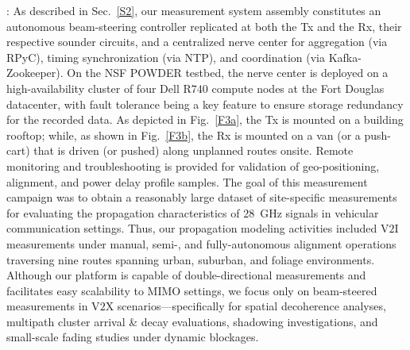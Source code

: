 \documentclass[10pt, twocolumn]{IEEEtran}
\begin{document}
: As described in Sec.~\ref{S2}, our measurement system assembly constitutes an autonomous beam-steering controller replicated at both the Tx and the Rx, their respective sounder circuits, and a centralized nerve center for aggregation (via RPyC), timing synchronization (via NTP), and coordination (via Kafka-Zookeeper). On the NSF POWDER testbed, the nerve center is deployed on a high-availability cluster of four Dell R$740$ compute nodes at the Fort Douglas datacenter, with fault tolerance being a key feature to ensure storage redundancy for the recorded data. As depicted in Fig.~\ref{F3a}, the Tx is mounted on a building rooftop; while, as shown in Fig.~\ref{F3b}, the Rx is mounted on a van (or a push-cart) that is driven (or pushed) along unplanned routes onsite. Remote monitoring and troubleshooting is provided for validation of geo-positioning, alignment, and power delay profile samples. The goal of this measurement campaign was to obtain a reasonably large dataset of site-specific measurements for evaluating the propagation characteristics of \SI{28}{\giga\hertz} signals in vehicular communication settings. Thus, our propagation modeling activities included V$2$I measurements under manual, semi-, and fully-autonomous alignment operations traversing nine routes spanning urban, suburban, and foliage environments. Although our platform is capable of double-directional measurements and facilitates easy scalability to MIMO settings, we focus only on beam-steered measurements in V$2$X scenarios---specifically for spatial decoherence analyses, multipath cluster arrival \& decay evaluations, shadowing investigations, and small-scale fading studies under dynamic blockages.
\end{document}
